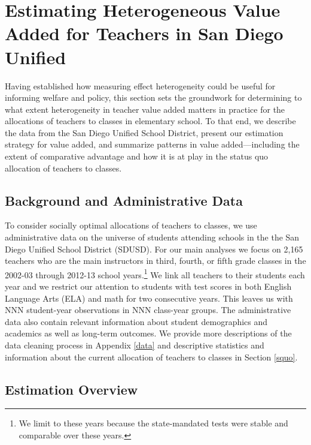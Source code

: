 \documentclass[12pt]{article}
\theoremstyle{definition}
\theoremstyle{definition}
\theoremstyle{definition}
\theoremstyle{definition}
\begin{document}
\section{Estimating Heterogeneous Value Added for Teachers in San Diego Unified}

Having established how measuring effect heterogeneity could be useful for informing welfare and policy, this section sets the groundwork for determining to what extent heterogeneity in teacher value added matters in practice for the allocations of teachers to classes in elementary school. To that end, we describe the data from the San Diego Unified School District, present our estimation strategy for value added, and summarize patterns in value added---including the extent of comparative advantage and how it is at play in the status quo allocation of teachers to classes.

\subsection{Background and Administrative Data}

To consider socially optimal allocations of teachers to classes, we use administrative data on the universe of students attending schools in the the San Diego Unified School District (SDUSD). For our main analyses we focus on 2,165 teachers who are the main instructors in third, fourth, or fifth grade classes in the 2002-03 through 2012-13 school years.\footnote{We limit to these years because the state-mandated tests were stable and comparable over these years.} We link all teachers to their students each year and we restrict our attention to students with test scores in both English Language Arts (ELA) and math for two consecutive years. This leaves us with NNN student-year observations in NNN class-year groups. The administrative data also contain relevant information about student demographics and academics as well as long-term outcomes. We provide more descriptions of the data cleaning process in Appendix \ref{data} and descriptive statistics and information about the current allocation of teachers to classes in Section \ref{squo}.


\subsection{Estimation Overview}
\end{document}
